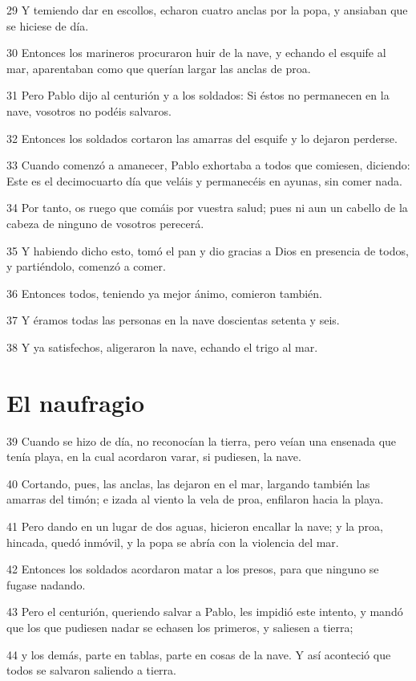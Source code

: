 \par 29 Y temiendo dar en escollos, echaron cuatro anclas por la popa, y ansiaban que se hiciese de día.
\par 30 Entonces los marineros procuraron huir de la nave, y echando el esquife al mar, aparentaban como que querían largar las anclas de proa.
\par 31 Pero Pablo dijo al centurión y a los soldados: Si éstos no permanecen en la nave, vosotros no podéis salvaros.
\par 32 Entonces los soldados cortaron las amarras del esquife y lo dejaron perderse.
\par 33 Cuando comenzó a amanecer, Pablo exhortaba a todos que comiesen, diciendo: Este es el decimocuarto día que veláis y permanecéis en ayunas, sin comer nada.
\par 34 Por tanto, os ruego que comáis por vuestra salud; pues ni aun un cabello de la cabeza de ninguno de vosotros perecerá.
\par 35 Y habiendo dicho esto, tomó el pan y dio gracias a Dios en presencia de todos, y partiéndolo, comenzó a comer.
\par 36 Entonces todos, teniendo ya mejor ánimo, comieron también.
\par 37 Y éramos todas las personas en la nave doscientas setenta y seis.
\par 38 Y ya satisfechos, aligeraron la nave, echando el trigo al mar.

\section*{El naufragio}

\par 39 Cuando se hizo de día, no reconocían la tierra, pero veían una ensenada que tenía playa, en la cual acordaron varar, si pudiesen, la nave.
\par 40 Cortando, pues, las anclas, las dejaron en el mar, largando también las amarras del timón; e izada al viento la vela de proa, enfilaron hacia la playa.
\par 41 Pero dando en un lugar de dos aguas, hicieron encallar la nave; y la proa, hincada, quedó inmóvil, y la popa se abría con la violencia del mar.
\par 42 Entonces los soldados acordaron matar a los presos, para que ninguno se fugase nadando.
\par 43 Pero el centurión, queriendo salvar a Pablo, les impidió este intento, y mandó que los que pudiesen nadar se echasen los primeros, y saliesen a tierra;
\par 44 y los demás, parte en tablas, parte en cosas de la nave. Y así aconteció que todos se salvaron saliendo a tierra.

